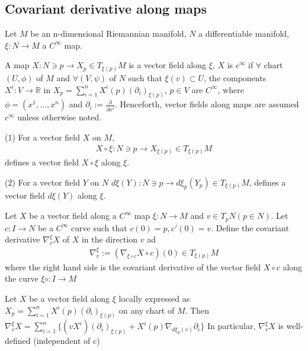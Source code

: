 \subsection{Covariant derivative along maps}
Let $M$ be an n-dimensional Riemannian manifold, $N$ a differentiable manifold, $\xi:N \to M$ a $C^{\infty}$ map.
\begin{definition}
    A map $X: N \owns p \to X_p \in T_{\xi(p)}M$ is a  vector field along $\xi$, $X$ is $c^{\infty}$ if $\forall$ chart $(U, \phi)$ of $M$ and $\forall (V, \psi)$ of $N$ such that $\xi(v) \subset U$,
    the components $X^i: V \to \mathbb{R}$ in $X_p = \sum_{i=1}^n X^i(p)(\partial_i)_{\xi(p)}$, $p\in V$ are $C^{\infty}$, where 
$\phi = (x^1, \dots, x^n)$ and $\partial_i := \frac{\partial}{\partial x^i}$.
Henceforth, vector fields along maps are assumed $c^{\infty}$ unless otherwise noted.
\end{definition}
\begin{definition}
    (1) For a vector field $X$ on $M$,
    \[\begin{aligned}
        X \circ \xi : N \owns p \to X_{\xi(p)} \in T_{\xi(p)}M
    \end{aligned}\]
    defines a vector field $X \circ \xi$ along $\xi$.

    (2) For a vector field $Y$ on $N$
    $d \xi(Y) : N \owns p \to d \xi_p(Y_p) \in T_{\xi(p)}M$, defines a vector field $d \xi(Y)$ along $\xi$.
\end{definition}

\begin{definition}
    Let $X$ be a vector field along a $C^{\infty}$ map $\xi:N \to M$
    and $v \in T_p N (p\in N)$. Let $c:I \to N$ be a $C^{\infty}$ curve such that
    $c(0) = p, c'(0) = v$. Define the covariant derivative $\nabla_v^{\xi}X$ of $X$ in the direction $v$ ad
    \[
    \begin{aligned}
        \nabla_v^{\xi} := \left(\nabla_{\xi \circ c} X \circ c  \right)(0) \in T_{\xi(p)}M
    \end{aligned}
    \]
    where the right hand side is the covariant derivative of the vector field $X \circ c$ along the curve $\xi \circ : I \to M$
\end{definition}

\begin{lemma}
    Let $X$ be a vector field along $\xi$ locally expressed as $X_p = \sum_{i=1}^n X^i(p)(\partial_i)_{\xi(p)}$ on any chart of $M$.
    Then $\nabla_v^{\xi}X = \sum_{i=1}^n\{(v X^i)(\partial_i)_{\xi(p)}+ X^i(p) \nabla_{d \xi_p(v)}\partial_i\}$
    In particular, $\nabla_v^{\xi}X$ is well-defined (independent of c)
    \label{lemma:independence_of_nabla}
\end{lemma}


